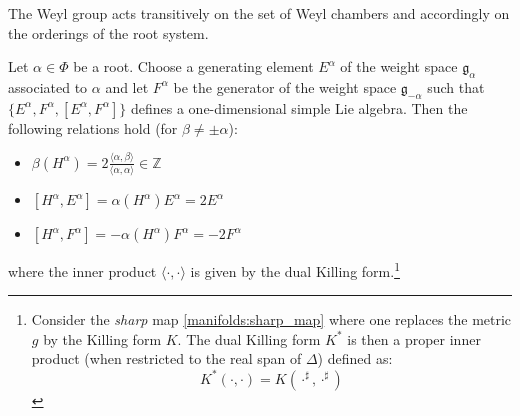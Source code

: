         \begin{property}
        	The Weyl group acts transitively on the set of Weyl chambers and accordingly on the orderings of the root system.
        \end{property}

        \begin{property}
        	Let $\alpha\in\Phi$ be a root. Choose a generating element $E^\alpha$ of the weight space $\mathfrak{g}_\alpha$ associated to $\alpha$ and let $F^\alpha$ be the generator of the weight space $\mathfrak{g}_{-\alpha}$ such that $\{E^\alpha, F^\alpha, [E^\alpha, F^\alpha]\}$ defines a one-dimensional simple Lie algebra. Then the following relations hold (for $\beta\neq\pm\alpha$):
        	\begin{itemize}
        		\item $\beta(H^\alpha) = 2\frac{\langle\alpha, \beta\rangle}{\langle\alpha, \alpha\rangle}\in\mathbb{Z}$
        		\item $[H^\alpha, E^\alpha] = \alpha(H^\alpha)E^\alpha = 2E^\alpha$
        		\item $[H^\alpha, F^\alpha] = -\alpha(H^\alpha)F^\alpha = -2F^\alpha$
        	\end{itemize}
        	where the inner product $\langle\cdot,\cdot\rangle$ is given by the dual Killing form.\footnote{Consider the \textit{sharp} map \ref{manifolds:sharp_map} where one replaces the metric $g$ by the Killing form $K$. The dual Killing form $K^*$ is then a proper inner product (when restricted to the real span of $\Delta$) defined as: \[K^*(\cdot, \cdot) = K(\cdot^\sharp, \cdot^\sharp)\]}
        \end{property}

